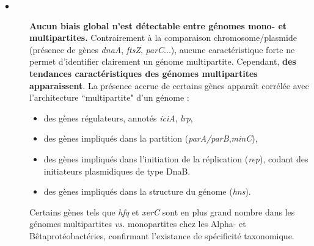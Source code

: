 \begin{description}
\item[$\bullet$] \textbf{Aucun biais global n'est détectable entre génomes mono- et multipartites.} Contrairement à la comparaison chromosome/plasmide (présence de gènes \textit{dnaA}, \textit{ftsZ}, \textit{parC}...), aucune caractéristique forte ne permet d'identifier clairement un génome multipartite. Cependant, \textbf{\color{orange} des tendances caractéristiques des génomes multipartites apparaissent}. La présence accrue de certains gènes apparaît corrélée avec l'architecture ``multipartite" d'un génome :
\begin{itemize}
 \item des gènes régulateurs, annotés \textit{iciA}, \textit{lrp},
 \item des gènes impliqués dans la partition (\textit{parA/parB},\textit{minC}),
 \item des gènes impliqués dans l'initiation de la réplication (\textit{rep}), codant des initiateurs plasmidiques de type DnaB.
 \item des gènes impliqués dans la structure du génome (\textit{hns}).
 \end{itemize} 
Certains gènes tels que \textit{hfq} et \textit{xerC} sont en plus grand nombre dans les génomes multipartites \textit{vs.} monopartites chez les Alpha- et Bêtaprotéobactéries, confirmant l'existance de spécificité taxonomique.
\end{description} 

 
